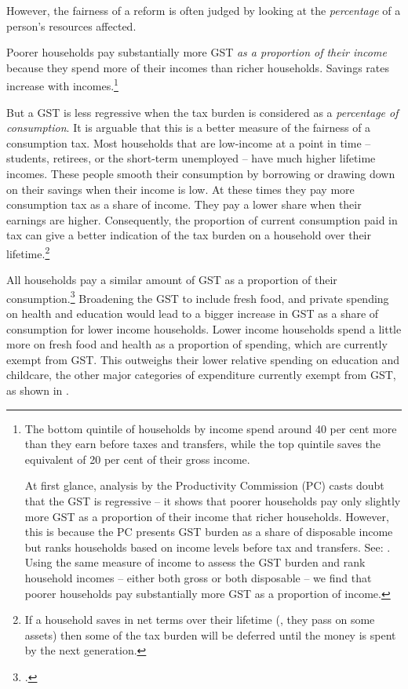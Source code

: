 However, the fairness of a reform is often judged by looking at the \emph{percentage} of a person’s resources affected.  

Poorer households pay substantially more GST \emph{as a proportion of their income} because they spend more of their incomes than richer households. Savings rates increase with incomes.\footnote{The bottom quintile of households by income spend around 40 per cent more than they earn before taxes and transfers, while the top quintile saves the equivalent of 20 per cent of their gross income. 

At first glance, analysis by the Productivity Commission (PC) casts doubt that the GST is regressive  – it shows that poorer households pay only slightly more GST as a proportion of their income that richer households. However, this is because the PC presents GST burden as a share of disposable income but ranks households based on income levels before tax and transfers. See: \textcite[][74--76]{ProductivityCommission2015-Tax-and-transfer-incidence}.  Using the same measure of income to assess the GST burden and rank household incomes – either both gross or both disposable – we find that poorer households pay substantially more GST as a proportion of income.
} 

But a GST is less regressive when the tax burden is considered as a \emph{percentage of consumption}. It is arguable that this is a better measure of the fairness of a consumption tax. Most households that are low-income at a point in time – students, retirees, or the short-term unemployed – have much higher lifetime incomes. These people smooth their consumption by borrowing or drawing down on their savings when their income is low. At these times they pay more consumption tax as a share of income. They pay a lower share when their earnings are higher. Consequently, the proportion of current consumption paid in tax can give a better indication of the tax burden on a household over their lifetime.\footnote{\textcites[][275]{HenryTaxReview2010}[][34--36]{OECDKoreaInstitutePublicFinance2014-Distributional-Effects-Consumption-Taxes} If a household saves in net terms over their lifetime (\ie, they pass on some assets) then some of the tax burden will be deferred until the money is spent by the next generation.}

All households pay a similar amount of GST as a proportion of their consumption.\footcite[][41]{OECDKoreaInstitutePublicFinance2014-Distributional-Effects-Consumption-Taxes} Broadening the GST to include fresh food, and private spending on health and education would lead to a bigger increase in GST as a share of consumption for lower income households. Lower income households spend a little more on fresh food and health as a proportion of spending, which are currently exempt from GST. This outweighs their lower relative spending on education and childcare, the other major categories of expenditure currently exempt from GST, as shown in .

